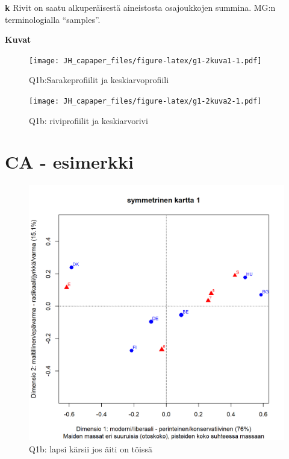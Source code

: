 \documentclass[
  finnish,
]{book}
\begin{document}
\textbf{k} Rivit on saatu alkuperäisestä aineistosta osajoukkojen summina. MG:n
terminologialla ``samples''.

\textbf{Kuvat}

\begin{figure}
\centering
\texttt{[image: JH\_capaper\_files/figure-latex/g1-2kuva1-1.pdf]}
\caption{\label{fig:g1-2kuva1}Q1b:Sarakeprofiilit ja keskiarvoprofiili}
\end{figure}

\begin{figure}
\centering
\texttt{[image: JH\_capaper\_files/figure-latex/g1-2kuva2-1.pdf]}
\caption{\label{fig:g1-2kuva2}Q1b: riviprofiilit ja keskiarvorivi}
\end{figure}

\hypertarget{ca---esimerkki}{%
\section{CA - esimerkki}\label{ca---esimerkki}}

\begin{figure}

{\centering \includegraphics[width=0.9\linewidth]{JH_capaper_files/figure-latex/simpleCA1map1-1} 

}

\caption{Q1b: lapsi kärsii jos äiti on töissä}\label{fig:simpleCA1map1}
\end{figure}
\end{document}
